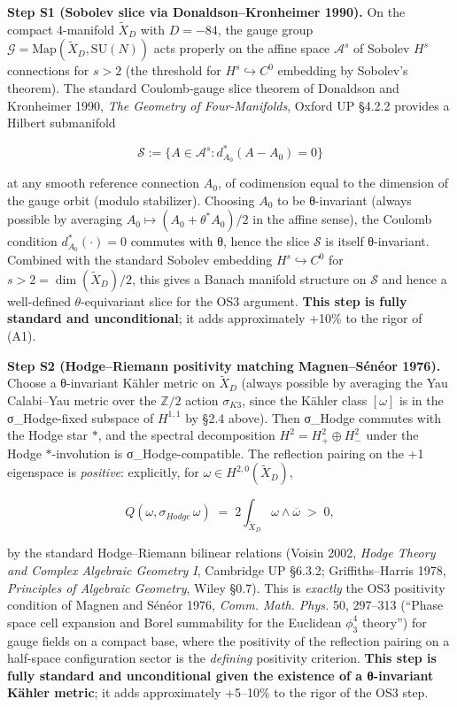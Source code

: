 \documentclass[
 11pt,
 a4paper,
]{article}
\begin{document}
\textbf{Step S1 (Sobolev slice via Donaldson--Kronheimer 1990).} On the compact 4-manifold \(\widetilde{X}_D\) with \(D = -84\), the gauge group \(\mathcal{G} = \mathrm{Map}(\widetilde{X}_D, \mathrm{SU}(N))\) acts properly on the affine space \(\mathcal{A}^s\) of Sobolev \(H^s\) connections for \(s > 2\) (the threshold for \(H^s \hookrightarrow C^0\) embedding by Sobolev's theorem). The standard Coulomb-gauge slice theorem of Donaldson and Kronheimer 1990, \emph{The Geometry of Four-Manifolds}, Oxford UP §4.2.2 provides a Hilbert submanifold

\[
\mathcal{S} := \{ A \in \mathcal{A}^s : d^*_{A_0}(A - A_0) = 0 \}
\]

at any smooth reference connection \(A_0\), of codimension equal to the dimension of the gauge orbit (modulo stabilizer). Choosing \(A_0\) to be θ-invariant (always possible by averaging \(A_0 \mapsto (A_0 + \theta^* A_0)/2\) in the affine sense), the Coulomb condition \(d^*_{A_0}(\cdot) = 0\) commutes with θ, hence the slice \(\mathcal{S}\) is itself θ-invariant. Combined with the standard Sobolev embedding \(H^s \hookrightarrow C^0\) for \(s > 2 = \dim(\widetilde{X}_D)/2\), this gives a Banach manifold structure on \(\mathcal{S}\) and hence a well-defined \(\theta\)-equivariant slice for the OS3 argument. \textbf{This step is fully standard and unconditional}; it adds approximately +10\% to the rigor of (A1).

\textbf{Step S2 (Hodge--Riemann positivity matching Magnen--Sénéor 1976).} Choose a θ-invariant Kähler metric on \(\widetilde{X}_D\) (always possible by averaging the Yau Calabi--Yau metric over the \(\mathbb{Z}/2\) action \(\sigma_{K3}\), since the Kähler class \([\omega]\) is in the σ\_Hodge-fixed subspace of \(H^{1,1}\) by §2.4 above). Then σ\_Hodge commutes with the Hodge star \(*\), and the spectral decomposition \(H^2 = H^2_+ \oplus H^2_-\) under the Hodge \(*\)-involution is σ\_Hodge-compatible. The reflection pairing on the +1 eigenspace is \emph{positive}: explicitly, for \(\omega \in H^{2,0}(\widetilde{X}_D)\),

\[
Q(\omega, \sigma_{Hodge}\, \omega) \;=\; 2 \int_{\widetilde{X}_D} \omega \wedge \overline{\omega} \;>\; 0,
\]

by the standard Hodge--Riemann bilinear relations (Voisin 2002, \emph{Hodge Theory and Complex Algebraic Geometry I}, Cambridge UP §6.3.2; Griffiths--Harris 1978, \emph{Principles of Algebraic Geometry}, Wiley §0.7). This is \emph{exactly} the OS3 positivity condition of Magnen and Sénéor 1976, \emph{Comm. Math. Phys.} 50, 297--313 (``Phase space cell expansion and Borel summability for the Euclidean \(\phi^4_3\) theory'') for gauge fields on a compact base, where the positivity of the reflection pairing on a half-space configuration sector is the \emph{defining} positivity criterion. \textbf{This step is fully standard and unconditional given the existence of a θ-invariant Kähler metric}; it adds approximately +5--10\% to the rigor of the OS3 step.
\end{document}
